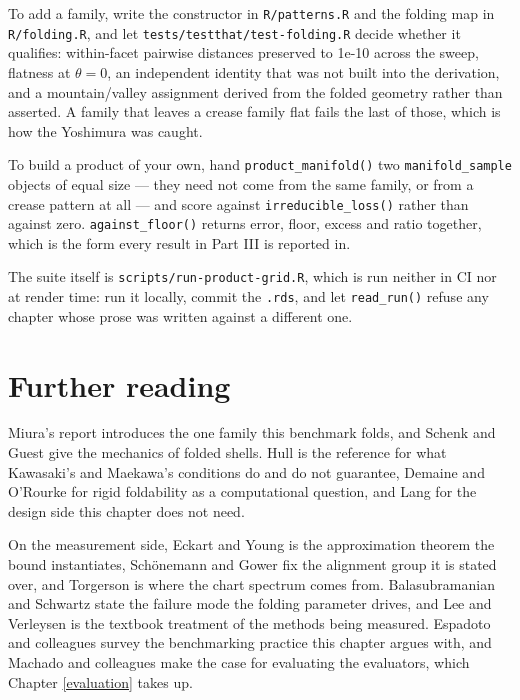\documentclass[
  british,
  a4paper,
]{book}
\begin{document}
To add a family, write the constructor in \texttt{R/patterns.R} and the folding map in
\texttt{R/folding.R}, and let \texttt{tests/testthat/test-folding.R} decide whether it
qualifies: within-facet pairwise distances preserved to
1e-10 across the sweep, flatness at
\(\theta = 0\), an independent identity that was not built into the derivation,
and a mountain/valley assignment derived from the folded geometry rather than
asserted. A family that leaves a crease family flat fails the last of those,
which is how the Yoshimura was caught.

To build a product of your own, hand \texttt{product\_manifold()} two \texttt{manifold\_sample}
objects of equal size --- they need not come from the same family, or from a
crease pattern at all --- and score against \texttt{irreducible\_loss()} rather than
against zero. \texttt{against\_floor()} returns error, floor, excess and ratio together,
which is the form every result in Part III is reported in.

The suite itself is \texttt{scripts/run-product-grid.R}, which is run neither in CI nor
at render time: run it locally, commit the \texttt{.rds}, and let \texttt{read\_run()} refuse
any chapter whose prose was written against a different one.

\section{Further reading}\label{bench-reading}

Miura's report \citep{miura1985method} introduces the one family this benchmark
folds, and Schenk and Guest \citep{schenk2013geometry} give the mechanics of folded
shells. Hull \citep{hull2020origametry} is the reference for what Kawasaki's and
Maekawa's conditions do and do not guarantee, Demaine and O'Rourke
\citep{demaine2007folding} for rigid foldability as a computational question, and
Lang \citep{lang2011origami} for the design side this chapter does not need.

On the measurement side, Eckart and Young \citep{eckart1936approximation} is the
approximation theorem the bound instantiates, Schönemann
\citep{schonemann1966procrustes} and Gower \citep{gower1975procrustes} fix the alignment
group it is stated over, and Torgerson \citep{torgerson1952mds} is where the chart
spectrum comes from. Balasubramanian and Schwartz \citep{balasubramanian2002isomap}
state the failure mode the folding parameter drives, and Lee and Verleysen
\citep{lee2007nonlinear} is the textbook treatment of the methods being measured.
Espadoto and colleagues \citep{espadoto2021survey} survey the benchmarking practice
this chapter argues with, and Machado and colleagues \citep{machado2025necessary}
make the case for evaluating the evaluators, which Chapter \ref{evaluation}
takes up.
\end{document}
